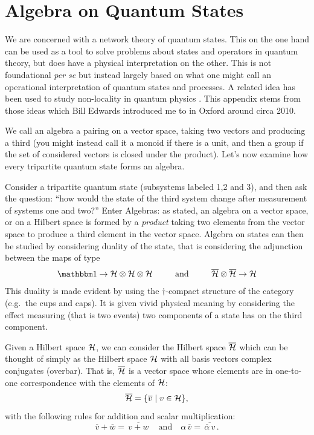 \section{Algebra on Quantum States}\label{sec:newalgebra}
We are concerned with a network theory of quantum states.  This on the one hand can
be used as a tool to solve problems about states and operators in quantum theory, but
does have a physical interpretation on the other.  This is not foundational
\textit{per se} but instead largely based on what one 
might call an operational interpretation of quantum states and processes.  A related idea has been used 
to study non-locality in quantum physics \cite{Edwards10}.  This appendix stems from those ideas \cite{Edwards10} which Bill Edwards introduced me to in Oxford around circa 2010.


We call
an algebra a pairing on a vector space, taking two vectors and producing a third
(you might instead call it a monoid if there is a unit, and then a group if the
set of considered vectors is closed under the product).  Let's now examine how every
tripartite quantum state forms an algebra.

Consider a tripartite quantum state (subsystems labeled 1,2 and 3), and then ask the
question: ``how would the state of the third system change after measurement of 
systems one and two?''   Enter Algebras: as stated, an algebra on a vector space, or
on a Hilbert space is formed by a \textit{product} taking two elements from the
vector space to produce a third element in the vector space.  Algebra on states can
then be studied by considering duality of the state, that is considering the
adjunction between the maps of type
\begin{equation}
\I\rightarrow \2 H\otimes \2H \otimes \2H~~~~~~~~\text{and}~~~~~~~~\overline{\2
H}\otimes \overline{\2H} \rightarrow \2H
\end{equation}
This duality is made evident by using the $\dagger$-compact structure of the category
(e.g.\ the cups and caps).  It is given vivid physical meaning by considering the
effect measuring (that is two events) two components of a state has on the third
component.

\begin{remark} Given a Hilbert space ${\cal H}$, we can
consider the Hilbert space $\overline{{\cal H}}$ which can be thought of simply as the
Hilbert space ${\cal H}$ with all basis vectors complex conjugates (overbar).  That is,
$\overline{{\cal H}}$ is a vector space whose elements are in one-to-one
correspondence with the elements of ${\cal H}$:
\begin{equation}
    \overline{{\cal H}} = \{\overline{v} \mid v \in {\cal H}\},
\end{equation}
with the following rules for addition and scalar multiplication:
\begin{equation}
    \overline v + \overline{w} =
\overline{\,v+w\,}\quad\text{and}\quad\alpha\,\overline v = \overline{\,\overline
\alpha \,v\,}.
\end{equation}
\end{remark}


